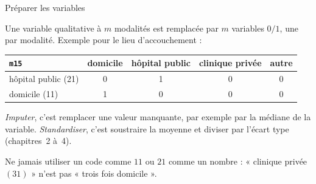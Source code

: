 \documentclass[aspectratio=169,11pt]{beamer}
\begin{document}
\begin{frame}{Préparer les variables}
  \begin{definition}
    Une variable qualitative à $m$ modalités est remplacée par $m$ variables $0/1$, une par modalité. Exemple pour le lieu d'accouchement :
    \begin{center}
      \small\renewcommand{\arraystretch}{1.1}
      \begin{tabular}{lcccc}
        \toprule
        \texttt{m15} & domicile & hôpital public & clinique privée & autre \\
        \midrule
        hôpital public (21) & 0 & 1 & 0 & 0 \\
        domicile (11) & 1 & 0 & 0 & 0 \\
        \bottomrule
      \end{tabular}
    \end{center}
  \end{definition}
  \begin{definition}
    \emph{Imputer}, c'est remplacer une valeur manquante, par exemple par la médiane de la variable.
    \emph{Standardiser}, c'est soustraire la moyenne et diviser par l'écart type (chapitres~2 à~4).
  \end{definition}
  {\small\color{cnfGris}Ne jamais utiliser un code comme $11$ ou $21$ comme un nombre : « clinique privée $(31)$ » n'est pas « trois fois domicile ».}
\end{frame}
\end{document}
